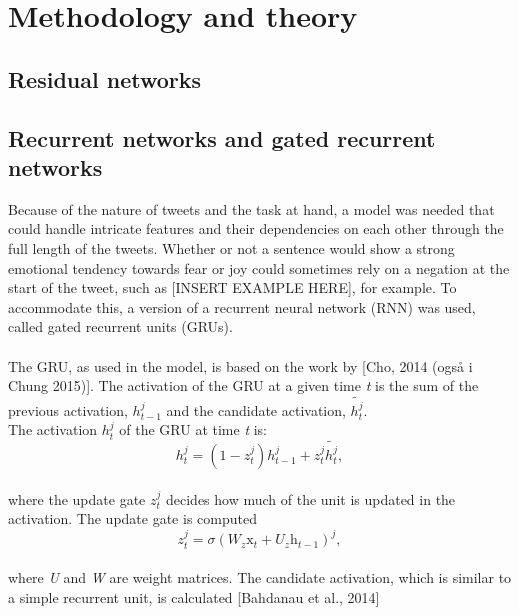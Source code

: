 
\section{Methodology and theory}

\subsection{Residual networks}

\subsection{Recurrent networks and gated recurrent networks}
Because of the nature of tweets and the task at hand, a model was needed that could handle intricate features and their dependencies on each other through the full length of the tweets. Whether or not a sentence would show a strong emotional tendency towards fear or joy could sometimes rely on a negation at the start of the tweet, such as  [INSERT EXAMPLE HERE], for example. To accommodate this, a version of a recurrent neural network (RNN) was used, called gated recurrent units (GRUs).\\
\\
The GRU, as used in the model, is based on the work by [Cho, 2014 (også i Chung 2015)]. The activation of the GRU at a given time \textit{t} is the sum of the previous activation, $h_{t-1}^{j}$ and the candidate activation, $\tilde{h_{t}^{j}}$.\\
The activation $h_{t}^{j}$ of the GRU at time \textit{t} is:\\

\begin{equation} \label{eq:activation}
h_{t}^{j} = \left(1 - z_{t}^{j}\right)h_{t-1}^{j}+z_{t}^{j}\tilde{h_{t}^{j}},
\end{equation}\\

where the update gate $z_{t}^{j}$ decides how much of the unit is updated in the activation. The update gate is computed\\

\begin{equation}\label{eq:update}
z_{t}^{j}=\sigma\left(W_{z}\mathrm{x}_{t}+U_{z}\mathrm{h}_{t-1}\right)^{j},
\end{equation}\\

where \textit{U} and \textit{W} are weight matrices. The candidate activation, which is similar to a simple recurrent unit, is calculated [Bahdanau et al., 2014]\\

